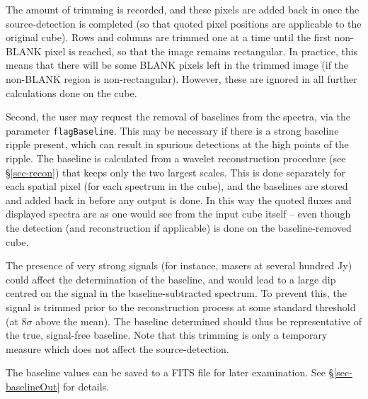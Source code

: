 The amount of trimming is recorded, and these pixels are added back in
once the source-detection is completed (so that quoted pixel positions
are applicable to the original cube). Rows and columns are trimmed one
at a time until the first non-BLANK pixel is reached, so that the
image remains rectangular. In practice, this means that there will be
some BLANK pixels left in the trimmed image (if the non-BLANK region
is non-rectangular). However, these are ignored in all further
calculations done on the cube.

\label{sec-baseline}

Second, the user may request the removal of baselines from the
spectra, via the parameter \texttt{flagBaseline}. This may be
necessary if there is a strong baseline ripple present, which can
result in spurious detections at the high points of the ripple. The
baseline is calculated from a wavelet reconstruction procedure (see
\S\ref{sec-recon}) that keeps only the two largest scales. This is
done separately for each spatial pixel (\ie for each spectrum in the
cube), and the baselines are stored and added back in before any
output is done. In this way the quoted fluxes and displayed spectra
are as one would see from the input cube itself -- even though the
detection (and reconstruction if applicable) is done on the
baseline-removed cube.

The presence of very strong signals (for instance, masers at several
hundred Jy) could affect the determination of the baseline, and would
lead to a large dip centred on the signal in the baseline-subtracted
spectrum. To prevent this, the signal is trimmed prior to the
reconstruction process at some standard threshold (at $8\sigma$ above
the mean). The baseline determined should thus be representative of
the true, signal-free baseline. Note that this trimming is only a
temporary measure which does not affect the source-detection.

The baseline values can be saved to a FITS file for later
examination. See \S\ref{sec-baselineOut} for details.

